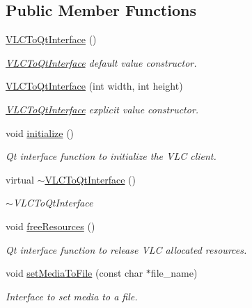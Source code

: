 \subsection*{Public Member Functions}
\begin{DoxyCompactItemize}
\item 
\hyperlink{classVLCToQtInterface_a782cd983a96f40d16c1f4ba12872e7a1}{V\-L\-C\-To\-Qt\-Interface} ()
\begin{DoxyCompactList}\small\item\em \hyperlink{classVLCToQtInterface}{V\-L\-C\-To\-Qt\-Interface} default value constructor. \end{DoxyCompactList}\item 
\hyperlink{classVLCToQtInterface_ac475e173dea8665cab256a9d8ac59fb2}{V\-L\-C\-To\-Qt\-Interface} (int width, int height)
\begin{DoxyCompactList}\small\item\em \hyperlink{classVLCToQtInterface}{V\-L\-C\-To\-Qt\-Interface} explicit value constructor. \end{DoxyCompactList}\item 
void \hyperlink{classVLCToQtInterface_aaf25e1804b120924ad8b49e36e2bfa8c}{initialize} ()
\begin{DoxyCompactList}\small\item\em Qt interface function to initialize the V\-L\-C client. \end{DoxyCompactList}\item 
virtual \hyperlink{classVLCToQtInterface_aa89b1e15f7e45b93b7ff24aa0a8cbd33}{$\sim$\-V\-L\-C\-To\-Qt\-Interface} ()
\begin{DoxyCompactList}\small\item\em $\sim$\-V\-L\-C\-To\-Qt\-Interface \end{DoxyCompactList}\item 
void \hyperlink{classVLCToQtInterface_af0941bf47aa0a581545f7a367e24185f}{free\-Resources} ()
\begin{DoxyCompactList}\small\item\em Qt interface function to release V\-L\-C allocated resources. \end{DoxyCompactList}\item 
void \hyperlink{classVLCToQtInterface_aea363afecbe6e3b47211eb94d9b918c6}{set\-Media\-To\-File} (const char $\ast$file\-\_\-name)
\begin{DoxyCompactList}\small\item\em Interface to set media to a file. \end{DoxyCompactList}\item 

\end{DoxyCompactItemize}
